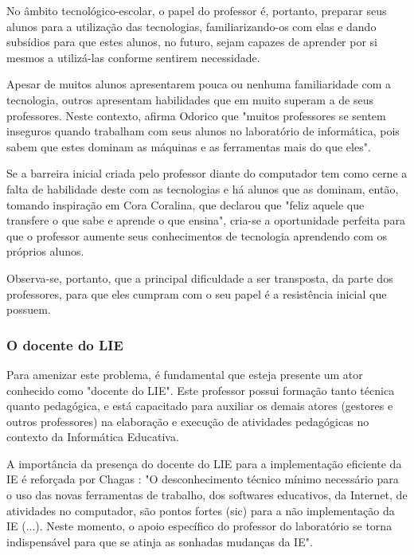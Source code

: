 No âmbito tecnológico-escolar, o papel do professor é, portanto, preparar seus alunos para a utilização das tecnologias, familiarizando-os com elas e dando subsídios para que estes alunos, no futuro, sejam capazes de aprender por si mesmos a utilizá-las conforme sentirem necessidade.

Apesar de muitos alunos apresentarem pouca ou nenhuma familiaridade com a tecnologia, outros apresentam habilidades que em muito superam a de seus professores. Neste contexto, afirma Odorico \cite{art:REF_ART_ODORICO} que "muitos professores se sentem inseguros quando trabalham com seus alunos no laboratório de informática, pois sabem que estes dominam as máquinas e as ferramentas mais do que eles".

Se a barreira inicial criada pelo professor diante do computador tem como cerne a falta de habilidade deste com as tecnologias e há alunos que as dominam, então, tomando inspiração em Cora Coralina, que declarou que "feliz aquele que transfere o que sabe e aprende o que ensina", cria-se a oportunidade perfeita para que o professor aumente seus conhecimentos de tecnologia aprendendo com os próprios alunos.

Observa-se, portanto, que a principal dificuldade a ser transposta, da parte dos professores, para que eles cumpram com o seu papel é a resistência inicial que possuem.

\subsubsection{O docente do LIE}\label{sec:LABEL_CHP_REF_TEO_SEC_DOC_LIE}

Para amenizar este problema, é fundamental que esteja presente um ator conhecido como "docente do LIE". Este professor possui formação tanto técnica quanto pedagógica, e está capacitado para auxiliar os demais atores (gestores e outros professores) na elaboração e execução de atividades pedagógicas no contexto da Informática Educativa.

A importância da presença do docente do LIE para a implementação eficiente da IE é reforçada por Chagas \cite{art:REF_ART_CHAGAS}: "O desconhecimento técnico mínimo necessário para o uso das novas ferramentas de trabalho, dos softwares educativos, da Internet, de atividades no computador, são pontos fortes (sic) para a não implementação da IE (...). Neste momento, o apoio específico do professor do laboratório se torna indispensável para que se atinja as sonhadas mudanças da IE".


